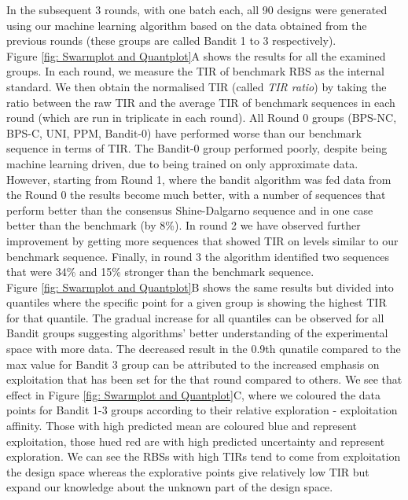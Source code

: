 \documentclass{article}
\begin{document}
In the subsequent 3 rounds, with one batch each, all 90 designs were generated using our machine learning algorithm based on the data obtained from the previous rounds (these groups are called Bandit 1 to 3 respectively).\\

Figure \ref{fig: Swarmplot and Quantplot}A shows the results for all the examined groups. 
In each round, we measure the TIR of benchmark RBS as the internal standard. 
We then obtain the normalised TIR (called \textit{TIR ratio}) by taking the ratio between the raw TIR and the average TIR of benchmark sequences in each round (which are run in triplicate in each round).
All Round 0 groups (BPS-NC, BPS-C, UNI, PPM, Bandit-0) have performed worse than our benchmark sequence in terms of TIR. 
The Bandit-0 group performed poorly, despite being machine learning driven, due to being trained on only approximate data.\\

However, starting from Round 1, where the bandit algorithm was fed data from the Round 0 the results become much better, with a number of sequences that perform better than the consensus Shine-Dalgarno sequence and in one case better than the benchmark (by 8\%).
In round 2 we have observed further improvement by getting more sequences that showed TIR on levels similar to our benchmark sequence.
Finally, in round 3 the algorithm identified two sequences that were 34\% and 15\% stronger than the benchmark sequence.\\

Figure \ref{fig: Swarmplot and Quantplot}B shows the same results but divided into quantiles where the specific point for a given group is showing the highest TIR for that quantile.
The gradual increase for all quantiles can be observed for all Bandit groups suggesting algorithms' better understanding of the experimental space with more data.
The decreased result in the 0.9th qunatile compared to the max value for Bandit 3 group can be attributed to the increased emphasis on exploitation that has been set for the that round compared to others.
We see that effect in Figure \ref{fig: Swarmplot and Quantplot}C, where we coloured the data points for Bandit 1-3 groups according to their relative exploration - exploitation affinity.
Those with high predicted mean are coloured blue and represent exploitation, those hued red are with high predicted uncertainty and represent exploration.
We can see the RBSs with high TIRs tend to come from exploitation the design space whereas the explorative points give relatively low TIR but expand our knowledge about the unknown part of the design space.\\
\end{document}
